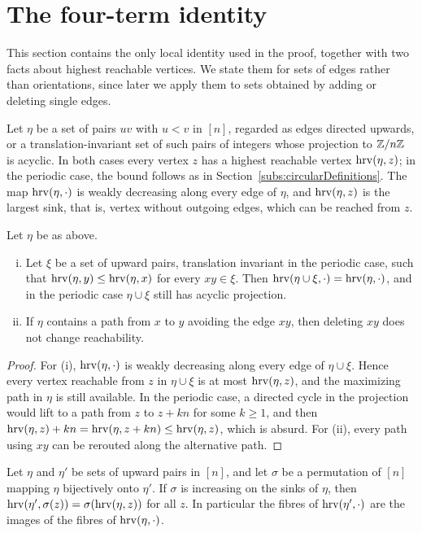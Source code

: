 \section{The four-term identity}\label{sec:local}

This section contains the only local identity used in the proof, together with
two facts about highest reachable vertices.
We state them for sets of edges rather than orientations, since later we
apply them to sets obtained by adding or deleting single edges.

Let $\eta$ be a set of pairs $uv$ with $u<v$ in $[n]$, regarded as edges directed
upwards, or a translation-invariant set of such pairs of integers whose
projection to $\mathbb{Z}/n\mathbb{Z}$ is acyclic.
In both cases every vertex $z$ has a highest reachable vertex $\operatorname{hrv}(\eta,z)$;
in the periodic case, the bound follows as in Section~\ref{subs:circularDefinitions}.
The map $\operatorname{hrv}(\eta,\cdot)$ is weakly decreasing along every edge of $\eta$, and
$\operatorname{hrv}(\eta,z)$ is the largest sink, that is, vertex without outgoing edges,
which can be reached from $z$.

\begin{lemma}\label{lem:ineffective}
Let $\eta$ be as above.
\begin{enumerate}[(i)]
\item Let $\xi$ be a set of upward pairs, translation invariant in the periodic
case, such that $\operatorname{hrv}(\eta,y)\leq\operatorname{hrv}(\eta,x)$ for every $xy\in\xi$.
Then $\operatorname{hrv}(\eta\cup\xi,\cdot)=\operatorname{hrv}(\eta,\cdot)$, and in the periodic case
$\eta\cup\xi$ still has acyclic projection.
\item If $\eta$ contains a path from $x$ to $y$ avoiding the edge $xy$, then
deleting $xy$ does not change reachability.
\end{enumerate}
\end{lemma}

\begin{proof}
For (i), $\operatorname{hrv}(\eta,\cdot)$ is weakly decreasing along every edge of
$\eta\cup\xi$.
Hence every vertex reachable from $z$ in $\eta\cup\xi$ is at most
$\operatorname{hrv}(\eta,z)$, and the maximizing path in $\eta$ is still available.
In the periodic case, a directed cycle in the projection would lift to a path
from $z$ to $z+kn$ for some $k\geq1$, and then
$\operatorname{hrv}(\eta,z)+kn=\operatorname{hrv}(\eta,z+kn)\leq\operatorname{hrv}(\eta,z)$, which is absurd.
For (ii), every path using $xy$ can be rerouted along the alternative path.
\end{proof}

\begin{lemma}\label{lem:sinkRelabel}
Let $\eta$ and $\eta'$ be sets of upward pairs in $[n]$, and let $\sigma$ be a
permutation of $[n]$ mapping $\eta$ bijectively onto $\eta'$.
If $\sigma$ is increasing on the sinks of $\eta$, then
$\operatorname{hrv}(\eta',\sigma(z))=\sigma(\operatorname{hrv}(\eta,z))$ for all $z$.
In particular the fibres of $\operatorname{hrv}(\eta',\cdot)$ are the images of the fibres of
$\operatorname{hrv}(\eta,\cdot)$.
\end{lemma}

